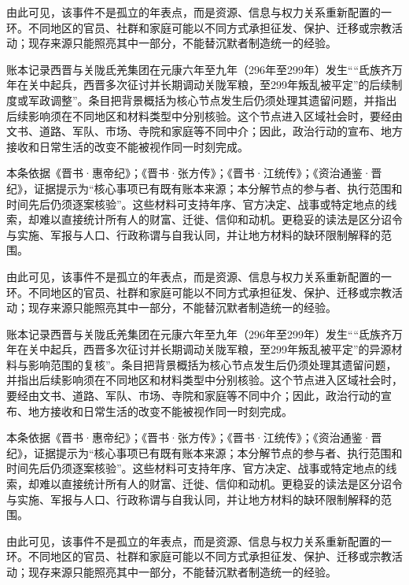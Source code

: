 由此可见，该事件不是孤立的年表点，而是资源、信息与权力关系重新配置的一环。不同地区的官员、社群和家庭可能以不同方式承担征发、保护、迁移或宗教活动；现存来源只能照亮其中一部分，不能替沉默者制造统一的经验。

账本记录西晋与关陇氐羌集团在元康六年至九年（296年至299年）发生““氐族齐万年在关中起兵，西晋多次征讨并长期调动关陇军粮，至299年叛乱被平定”的后续制度或军政调整”。条目把背景概括为核心节点发生后仍须处理其遗留问题，并指出后续影响须在不同地区和材料类型中分别核验。这个节点进入区域社会时，要经由文书、道路、军队、市场、寺院和家庭等不同中介；因此，政治行动的宣布、地方接收和日常生活的改变不能被视作同一时刻完成。

本条依据《晋书·惠帝纪》；《晋书·张方传》；《晋书·江统传》；《资治通鉴·晋纪》，证据提示为“核心事项已有既有账本来源；本分解节点的参与者、执行范围和时间先后仍须逐案核验”。这些材料可支持年序、官方决定、战事或特定地点的线索，却难以直接统计所有人的财富、迁徙、信仰和动机。更稳妥的读法是区分诏令与实施、军报与人口、行政称谓与自我认同，并让地方材料的缺环限制解释的范围。

由此可见，该事件不是孤立的年表点，而是资源、信息与权力关系重新配置的一环。不同地区的官员、社群和家庭可能以不同方式承担征发、保护、迁移或宗教活动；现存来源只能照亮其中一部分，不能替沉默者制造统一的经验。

账本记录西晋与关陇氐羌集团在元康六年至九年（296年至299年）发生““氐族齐万年在关中起兵，西晋多次征讨并长期调动关陇军粮，至299年叛乱被平定”的异源材料与影响范围的复核”。条目把背景概括为核心节点发生后仍须处理其遗留问题，并指出后续影响须在不同地区和材料类型中分别核验。这个节点进入区域社会时，要经由文书、道路、军队、市场、寺院和家庭等不同中介；因此，政治行动的宣布、地方接收和日常生活的改变不能被视作同一时刻完成。

本条依据《晋书·惠帝纪》；《晋书·张方传》；《晋书·江统传》；《资治通鉴·晋纪》，证据提示为“核心事项已有既有账本来源；本分解节点的参与者、执行范围和时间先后仍须逐案核验”。这些材料可支持年序、官方决定、战事或特定地点的线索，却难以直接统计所有人的财富、迁徙、信仰和动机。更稳妥的读法是区分诏令与实施、军报与人口、行政称谓与自我认同，并让地方材料的缺环限制解释的范围。

由此可见，该事件不是孤立的年表点，而是资源、信息与权力关系重新配置的一环。不同地区的官员、社群和家庭可能以不同方式承担征发、保护、迁移或宗教活动；现存来源只能照亮其中一部分，不能替沉默者制造统一的经验。

